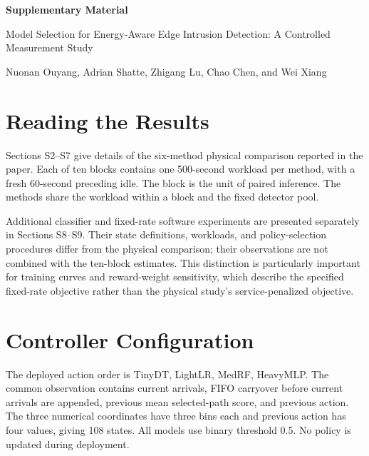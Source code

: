 \documentclass[10pt,a4paper]{article}
\begin{document}
\begin{center}
{\Large\bfseries Supplementary Material}\par\medskip
{\large Model Selection for Energy-Aware Edge Intrusion Detection: A Controlled Measurement Study}\par\medskip
Nuonan Ouyang, Adrian Shatte, Zhigang Lu, Chao Chen, and Wei Xiang
\end{center}

\section{Reading the Results}\label{sec:guide}
Sections S2--S7 give details of the six-method physical comparison reported in the paper. Each of ten blocks contains one 500-second workload per method, with a fresh 60-second preceding idle. The block is the unit of paired inference. The methods share the workload within a block and the fixed detector pool.

Additional classifier and fixed-rate software experiments are presented separately in Sections S8--S9. Their state definitions, workloads, and policy-selection procedures differ from the physical comparison; their observations are not combined with the ten-block estimates. This distinction is particularly important for training curves and reward-weight sensitivity, which describe the specified fixed-rate objective rather than the physical study's service-penalized objective.

\section{Controller Configuration}\label{sec:configuration}
The deployed action order is TinyDT, LightLR, MedRF, HeavyMLP. The common observation contains current arrivals, FIFO carryover before current arrivals are appended, previous mean selected-path score, and previous action. The three numerical coordinates have three bins each and previous action has four values, giving 108 states. All models use binary threshold 0.5. No policy is updated during deployment.
\end{document}
